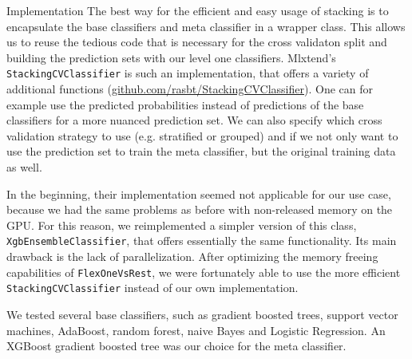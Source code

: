 \begin{section}{Implementation}
The best way for the efficient and easy usage of stacking is to encapsulate the base classifiers and meta classifier in a wrapper class. This allows us to reuse the tedious code that is necessary for the cross validaton split and building the prediction sets with our level one classifiers. Mlxtend's \texttt{StackingCVClassifier} is such an implementation, that offers a variety of additional functions (\href{http://rasbt.github.io/mlxtend/user_guide/classifier/StackingCVClassifier/}{github.com/rasbt/StackingCVClassifier}). One can for example use the predicted probabilities instead of predictions of the base classifiers for a more nuanced prediction set. We can also specify which cross validation strategy to use (e.g. stratified or grouped) and if we not only want to use the prediction set to train the meta classifier, but the original training data as well.

In the beginning, their implementation seemed not applicable for our use case, because we had the same problems as before with non-released memory on the GPU. For this reason, we reimplemented a simpler version of this class, \texttt{XgbEnsembleClassifier}, that offers essentially the same functionality. Its main drawback is the lack of parallelization. After optimizing the memory freeing capabilities of \texttt{FlexOneVsRest}, we were fortunately able to use the more efficient \texttt{StackingCVClassifier} instead of our own implementation.

We tested several base classifiers, such as gradient boosted trees, support vector machines, AdaBoost, random forest, naive Bayes and Logistic Regression. An XGBoost gradient boosted tree was our choice for the meta classifier.

\end{section}

